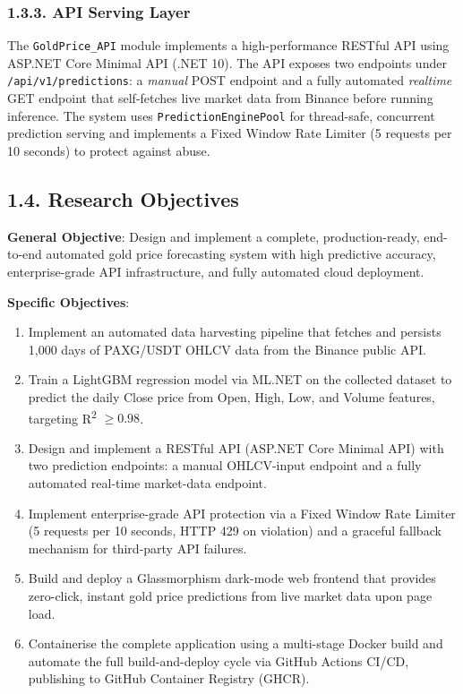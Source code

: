 \subsubsection{1.3.3. API Serving Layer}
The \texttt{GoldPrice\_API} module implements a high-performance RESTful API using ASP.NET Core Minimal API (.NET 10). The API exposes two endpoints under \texttt{/api/v1/predictions}: a \textit{manual} POST endpoint and a fully automated \textit{realtime} GET endpoint that self-fetches live market data from Binance before running inference. The system uses \texttt{PredictionEnginePool} for thread-safe, concurrent prediction serving and implements a Fixed Window Rate Limiter (5 requests per 10 seconds) to protect against abuse.

\subsection{1.4. Research Objectives}

\textbf{General Objective}: Design and implement a complete, production-ready, end-to-end automated gold price forecasting system with high predictive accuracy, enterprise-grade API infrastructure, and fully automated cloud deployment.

\textbf{Specific Objectives}:
\begin{enumerate}
  \item Implement an automated data harvesting pipeline that fetches and persists 1,000 days of PAXG/USDT OHLCV data from the Binance public API.
  \item Train a LightGBM regression model via ML.NET on the collected dataset to predict the daily Close price from Open, High, Low, and Volume features, targeting R\textsuperscript{2} $\geq 0.98$.
  \item Design and implement a RESTful API (ASP.NET Core Minimal API) with two prediction endpoints: a manual OHLCV-input endpoint and a fully automated real-time market-data endpoint.
  \item Implement enterprise-grade API protection via a Fixed Window Rate Limiter (5 requests per 10 seconds, HTTP 429 on violation) and a graceful fallback mechanism for third-party API failures.
  \item Build and deploy a Glassmorphism dark-mode web frontend that provides zero-click, instant gold price predictions from live market data upon page load.
  \item Containerise the complete application using a multi-stage Docker build and automate the full build-and-deploy cycle via GitHub Actions CI/CD, publishing to GitHub Container Registry (GHCR).
\end{enumerate}

